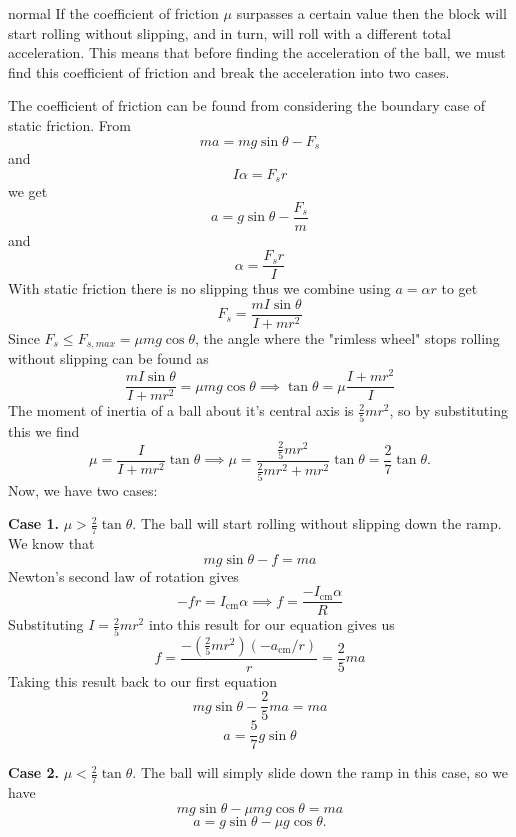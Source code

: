 \begin{solution}{normal}
If the coefficient of friction $\mu$ surpasses a certain value then the block will start rolling without slipping, and in turn, will roll with a different total acceleration. This means that before finding the acceleration of the ball, we must find this coefficient of friction and break the acceleration into two cases.
\vspace{2mm}

The coefficient of friction can be found from considering the boundary case of static friction.
From
$$ma=mg\sin\theta-F_s$$and
$$I\alpha=F_sr$$we get
$$a=g\sin\theta-\frac{F_s}{m}$$and
$$\alpha=\frac{F_sr}{I}$$With static friction there is no slipping thus we combine using $a=\alpha{r}$ to get
$$F_s=\frac{mI\sin\theta}{I+mr^2}$$Since $F_s\leq{F_{s,max}}=\mu mg\cos\theta$, the angle where the "rimless wheel" stops rolling without slipping can be found as
$$\frac{mI\sin\theta}{I+mr^2}=\mu mg\cos\theta\implies \tan\theta=\mu\frac{I+mr^2}{I}$$The moment of inertia of a ball about it's central axis is $\frac{2}{5}mr^2$, so by substituting this we find
\[\mu=\frac{I}{I+mr^2}\tan\theta\implies\mu=\frac{\frac{2}{5}mr^2}{\frac{2}{5}mr^2+mr^2}\tan\theta=\frac{2}{7}\tan\theta.\]Now, we have two cases:
\vspace{2mm}

\textbf{Case 1.} $\mu>\frac{2}{7}\tan\theta$. The ball will start rolling without slipping down the ramp. We know that
\[mg\sin\theta-f=ma\]Newton’s second law of rotation gives
\[-fr=I_{\text{cm}}\alpha\implies f=\frac{-I_{\text{cm}}\alpha}{R}\]Substituting $I=\frac{2}{5}mr^2$ into this result for our equation gives us
\[f=\frac{-\left(\frac{2}{5}mr^2\right)(-a_{\text{cm}}/r)}{r}=\frac{2}{5}ma\]Taking this result back to our first equation
\[mg\sin\theta-\frac{2}{5}ma=ma\]\[a=\frac{5}{7}g\sin\theta\]
\vspace{3mm}

\textbf{Case 2.} $\mu<\frac{2}{7}\tan\theta$. The ball will simply slide down the ramp in this case, so we have
\[mg\sin\theta-\mu mg\cos\theta=ma\]\[a=g\sin\theta-\mu g\cos\theta.\]
\end{solution}
